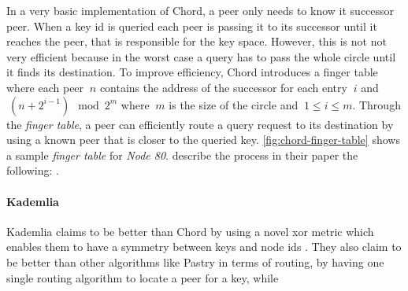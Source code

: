 In a very basic implementation of Chord, a peer only needs to know it successor peer. When a key id is queried each peer is passing it to its successor until it reaches the peer, that is responsible for the key space. However, this is not not very efficient because in the worst case a query has to pass the whole circle until it finds its destination. To improve efficiency, Chord introduces a finger table where each peer $\ n $ contains the address of the successor for each entry $\ i $ and $\ (n + 2^{i-1}) \mod 2^m $ where $\ m $ is the size of the circle and $\ 1 \leq i \leq m$. Through the \textit{finger table}, a peer can efficiently route a query request to its destination by using a known peer that is closer to the queried key. \vref{fig:chord-finger-table} shows a sample \textit{finger table} for \textit{Node 80}.
\citet[\S4.3]{chord} describe the process in their paper the following: .

\paragraph{Kademlia}\label{par:kademlia}
Kademlia claims to be better than Chord by using a novel \gls{xor} metric which enables them to have a symmetry between keys and node ids \cite[\S1]{kademlia}. They also claim to be better than other algorithms like Pastry in terms of routing, by having one single routing algorithm to locate a peer for a key, while \cite[\S1]{kademlia}

